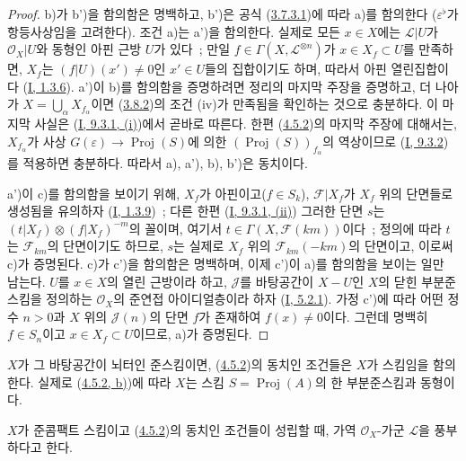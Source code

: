 \begin{proof}
b)가 b')을 함의함은 명백하고, b')은 공식
(\hyperref[II.3.7.3.1-ko]{3.7.3.1})에 따라 a)를 함의한다
($\varepsilon^\flat$가 항등사상임을 고려한다). 조건 a)는 a')을
함의한다. 실제로 모든 $x\in X$에는 $\mathcal{L}|U$가
$\mathcal{O}_X|U$와 동형인 아핀 근방 $U$가 있다~; 만일
$f\in\Gamma(X,\mathcal{L}^{\otimes n})$가
$x\in X_f\subset U$를 만족하면, $X_f$는
$(f|U)(x')\neq0$인 $x'\in U$들의 집합이기도 하며, 따라서 아핀
열린집합이다 (\hyperref[I.1.3.6-ko]{I, 1.3.6}). a')이 b)를
함의함을 증명하려면 정리의 마지막 주장을 증명하고, 더 나아가
$X=\bigcup_\alpha X_{f_\alpha}$이면
(\hyperref[II.3.8.2-ko]{3.8.2})의 조건 (iv)가 만족됨을 확인하는 것으로
충분하다. 이 마지막 사실은 (\hyperref[I.9.3.1-ko]{I, 9.3.1, (i)})에서
곧바로 따른다. 한편 (\hyperref[II.4.5.2-ko]{4.5.2})의 마지막 주장에
대해서는, $X_{f_\alpha}$가 사상
$G(\varepsilon)\to\operatorname{Proj}(S)$에 의한
$(\operatorname{Proj}(S))_{f_\alpha}$의 역상이므로
(\hyperref[I.9.3.2-ko]{I, 9.3.2})를 적용하면 충분하다. 따라서 a),
a'), b), b')은 동치이다.

a')이 c)를 함의함을 보이기 위해, $X_f$가 아핀이고($f\in S_k$),
$\mathcal{F}|X_f$가 $X_f$ 위의 단면들로 생성됨을 유의하자
(\hyperref[I.1.3.9-ko]{I, 1.3.9})~; 다른 한편
(\hyperref[I.9.3.1-ko]{I, 9.3.1, (ii)}) 그러한 단면 $s$는
$(t|X_f)\otimes(f|X_f)^{-m}$의 꼴이며, 여기서
$t\in\Gamma(X,\mathcal{F}(km))$이다~; 정의에 따라
$t$는 $\mathcal{F}_{km}$의 단면이기도 하므로, $s$는 실제로 $X_f$
위의 $\mathcal{F}_{km}(-km)$의 단면이고, 이로써 c)가 증명된다. c)가
c')을 함의함은 명백하며, 이제 c')이 a)를 함의함을 보이는 일만 남는다.
$U$를 $x\in X$의 열린 근방이라 하고, $\mathcal{J}$를 바탕공간이
$X-U$인 $X$의 닫힌 부분준스킴을 정의하는 $\mathcal{O}_X$의 준연접
아이디얼층이라 하자 (\hyperref[I.5.2.1-ko]{I, 5.2.1}). 가정 c')에 따라
어떤 정수 $n>0$과 $X$ 위의 $\mathcal{J}(n)$의 단면 $f$가 존재하여
$f(x)\neq0$이다. 그런데 명백히 $f\in S_n$이고
$x\in X_f\subset U$이므로, a)가 증명된다.
\end{proof}

$X$가 그 바탕공간이 뇌터인 준스킴이면,
(\hyperref[II.4.5.2-ko]{4.5.2})의 동치인 조건들은 $X$가 스킴임을
함의한다. 실제로 (\hyperref[II.4.5.2-ko]{4.5.2, b)})에 따라 $X$는
스킴 $S=\operatorname{Proj}(A)$의 한 부분준스킴과 동형이다.

\begin{definition}[4.5.3]
\label{II.4.5.3-ko}
$X$가 준콤팩트 스킴이고 (\hyperref[II.4.5.2-ko]{4.5.2})의 동치인
조건들이 성립할 때, 가역 $\mathcal{O}_X$-가군 $\mathcal{L}$을
풍부하다고 한다.
\end{definition}

